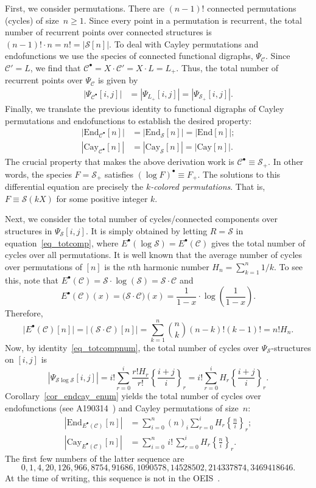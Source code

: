 \documentclass[a4paper,11pt,UKenglish]{article}
\newcommand{\Set}{E}
\newcommand{\Lin}{L}
\newcommand{\Sym}{\mathcal{S}}
\newcommand{\End}{\mathrm{End}}
\newcommand{\Cyc}{\mathcal{C}}
\newcommand{\Cay}{\mathrm{Cay}}
\newcommand{\sdiff}[3]{\genfrac{\{}{\}}{}{}{{#1}}{{#2}}_{{#3}}}
\newcommand{\Har}[1]{H_{#1}}
\newcommand{\ff}[2]{(#1)_{#2}}
\theoremstyle{definition}
\begin{document}
First, we consider permutations. There are $(n-1)!$ connected
permutations (cycles) of size~$n\geq 1$. Since every point in a
permutation is recurrent, the total number of recurrent points over
connected structures is $(n-1)!\cdot n=n!=|\Sym[n]|$.  To deal with
Cayley permutations and endofunctions we use the species of connected
functional digraphs, $\Psi_{\Cyc}$. Since $\Cyc'=\Lin$, we find that
$\Cyc^{\bullet} = X\cdot \Cyc' = X\cdot \Lin = \Lin_+$.
Thus, the total number of recurrent points over $\Psi_{\Cyc}$ is given by
\begin{align*}
|\Psi_{\Cyc^{\bullet}}[i,j]|
&=|\Psi_{\Lin_+}[i,j]|
=|\Psi_{\Sym_+}[i,j]|.
\end{align*}
Finally, we translate the previous identity to functional digraphs of
Cayley permutations and endofunctions to establish the desired property:
\begin{align*}
|\End_{\Cyc^{\bullet}}[n]|
&=|\End_{\Sym}[n]|=|\End[n]|;\\
|\Cay_{\Cyc^{\bullet}}[n]|
&=|\Cay_{\Sym}[n]|=|\Cay[n]|.
\end{align*}
The crucial property that makes the above derivation work is
$\Cyc^{\bullet} \equiv \Sym_+$. In other words, the species $F=\Sym_+$
satisfies $(\log F)^{\bullet}\equiv F_+$. The
solutions to this differential equation are precisely the \emph{$k$-colored
  permutations}. That is, $F \equiv \Sym(kX)$ for some positive integer
$k$.

Next, we consider the total number of cycles/connected components
over structures in $\Psi_{\Sym}[i,j]$. It is simply obtained by
letting $R=\Sym$ in equation~\eqref{eq_totcomp}, where
$\Set^{\bullet}(\log\Sym)=\Set^{\bullet}(\Cyc)$ gives
the total number of cycles over all permutations.
It is well known
that the average number
of cycles over permutations of $[n]$ is the $n$th harmonic number
$\Har{n}=\sum_{k=1}^n 1/k$. To see this, note that
$\Set^{\bullet}(\Cyc)=\Sym\cdot\log(\Sym)=\Sym\cdot\Cyc$
and
\[
\Set^{\bullet}(\Cyc)(x)
=\bigl(\Sym\cdot\Cyc\bigr)(x)
=\frac{1}{1-x}\cdot\log\left(\frac{1}{1-x}\right).
\]
Therefore,
$$
\bigl|\Set^{\bullet}(\Cyc)[n]\bigr|
=\bigl|(\Sym\cdot\Cyc)[n]\bigr|
=\sum_{k=1}^n\binom{n}{k}(n-k)!(k-1)!=n!\Har{n}.
$$
Now, by identity~\eqref{eq_totcompnum}, the total
number of cycles over $\Psi_{\Sym}$-structures on $[i,j]$ is
$$
|\Psi_{\Sym\log\Sym}[i,j]|
=i!\sum_{r=0}^i\frac{r!\Har{r}}{r!}\sdiff{i+j}{i}{r}
=i!\sum_{r=0}^i\Har{r}\sdiff{i+j}{i}{r}.
$$
Corollary~\ref{cor_endcay_enum} yields the total
number of cycles over endofunctions (see A190314~\cite{Sl}) and
Cayley permutations of size~$n$:
\begin{align*}
|\End_{\Set^{\bullet}(\Cyc)}[n]|
&=\sum_{i=0}^n\ff{n}{i}\sum_{r=0}^i\Har{r}\sdiff{n}{i}{r};\\
|\Cay_{\Set^{\bullet}(\Cyc)}[n]|
&=\sum_{i=0}^n\,i!\,\sum_{r=0}^i\Har{r}\sdiff{n}{i}{r}.
\end{align*}
The first few numbers of the latter sequence are
$$
0, 1, 4, 20, 126, 966, 8754, 91686, 1090578, 14528502, 214337874, 3469418646.
$$
At the time of writing, this sequence is not in the OEIS~\cite{Sl}.
\end{document}
